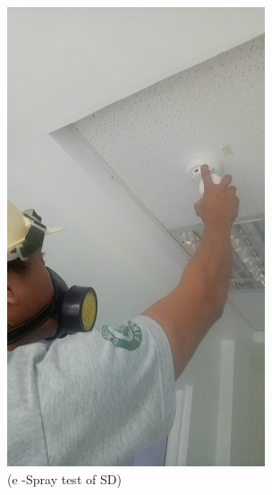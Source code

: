\begin{figure}
\begin{minipage}[b]{0.25\linewidth}
	\includegraphics[width=\textwidth]{figures/R1P_fdas/spraytest.jpg}
	\caption*{(e -Spray test of SD)}
\end{minipage}
	\hspace{0.05cm}
\begin{minipage}[b]{0.25\linewidth}
	\centering

\end{minipage}
\end{figure}
